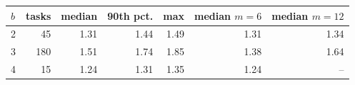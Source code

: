 \begin{center}\small\begin{tabular}{lrrrrrr}\toprule
$b$ & tasks & median & 90th pct. & max & median $m=6$ & median $m=12$ \\
\midrule
2 & 45 & 1.31 & 1.44 & 1.49 & 1.31 & 1.34 \\
3 & 180 & 1.51 & 1.74 & 1.85 & 1.38 & 1.64 \\
4 & 15 & 1.24 & 1.31 & 1.35 & 1.24 & -- \\
\bottomrule\end{tabular}\end{center}
